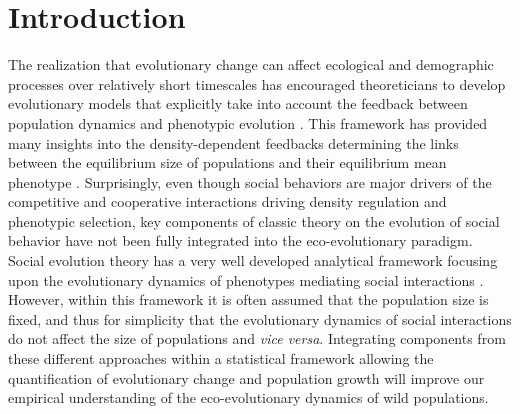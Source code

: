 \documentclass{article}
\begin{document}
\newpage
\section{Introduction}
 The realization that evolutionary change can affect ecological and demographic processes over relatively short timescales has encouraged theoreticians to develop evolutionary models that explicitly take into account the feedback between population dynamics and phenotypic evolution \citep{Govaert2019, hendry2016eco}. This framework has provided many insights into the density-dependent feedbacks determining the links between the equilibrium size of populations and their equilibrium mean phenotype \citep{MacArthur1962, Charlesworth1994, Lande2009a, Engen2013, Engen2020}. Surprisingly, even though social behaviors are major drivers of the competitive and cooperative interactions driving density regulation and phenotypic selection, key components of classic theory on the evolution of social behavior have not been fully integrated into the eco-evolutionary paradigm. Social evolution theory has a very well developed analytical framework focusing upon the evolutionary dynamics of phenotypes mediating social interactions \citep{frank1998foundations, Wolf1999SocialSelection, Queller1985a, Queller2017, Araya-Ajoy2020}. However, within this framework it is often assumed that the population size is fixed, and thus for simplicity that the evolutionary dynamics of social interactions do not affect the size of populations and  \textit{vice versa}. Integrating components from these different approaches within a statistical framework allowing the quantification of evolutionary change and population growth will improve our empirical understanding of the eco-evolutionary dynamics of wild populations.
\end{document}
